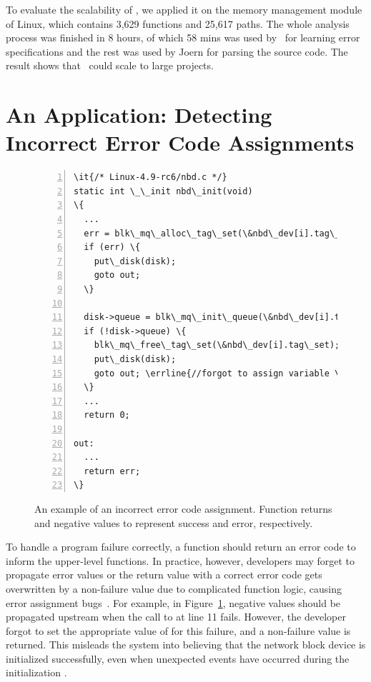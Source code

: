\documentclass[12pt]{report}	%
\begin{document}
To evaluate the scalability of \newTool,
we applied it on the memory management module of Linux,
which contains 3,629 functions and 25,617 paths.
The whole analysis process was finished in 8 hours, of which
58 mins was used by \newTool\ for learning error specifications and
the rest was used by Joern for parsing the source code.
The result shows that \newTool\ could scale to large projects.

\section{An Application: Detecting Incorrect Error Code Assignments}
\label{sec:app:evalbugs}

\begin{figure}[t]
\begin{Verbatim}[numbers=left,xleftmargin=6mm,fontsize=\footnotesize,
    commandchars=\\\{\}]
\it{/* Linux-4.9-rc6/nbd.c */}
static int \_\_init nbd\_init(void)
\{
  ...
  err = blk\_mq\_alloc\_tag\_set(\&nbd\_dev[i].tag\_set);
  if (err) \{
    put\_disk(disk);
    goto out;
  \}

  disk->queue = blk\_mq\_init\_queue(\&nbd\_dev[i].tag\_set);
  if (!disk->queue) \{
    blk\_mq\_free\_tag\_set(\&nbd\_dev[i].tag\_set);
    put\_disk(disk);
    goto out; \errline{//forgot to assign variable \it{err}} \errline{with correct error value.}
  \}
  ...
  return 0;

out:
  ...
  return err;
\}
\end{Verbatim}
\caption{An example of an incorrect error code assignment.
Function  returns  and negative values to represent success and error, respectively.}
\label{fig:errbug}
\end{figure}

To handle a program failure correctly, a function should return an error code
to inform the upper-level functions.
In practice, however, developers may forget to propagate error values
or the return value with a correct error code gets 
overwritten by a non-failure value due to complicated function logic,
causing error assignment bugs~\cite{gunawi2008eio,liang2016antminer,Tian:2017:ADR}.
For example, in Figure~\ref{fig:errbug}, 
negative values should be propagated upstream when the call to
 at line 11 fails.
However, the developer forgot to set the appropriate value of  
for this failure, and a non-failure value  is returned.
This misleads the system into believing that the network block device is initialized successfully, 
even when unexpected events have occurred during the initialization  . 
%
\end{document}
